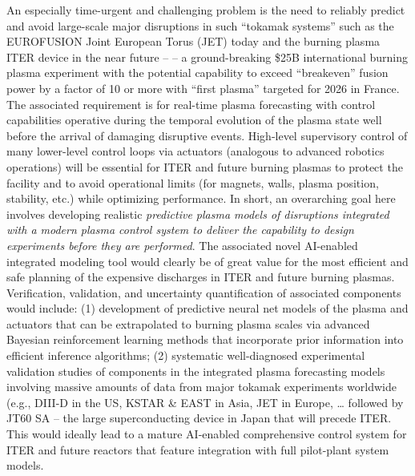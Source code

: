 An especially time-urgent and challenging problem is the need to reliably predict and avoid large-scale major disruptions in such “tokamak systems” such as the EUROFUSION Joint European Torus (JET) today and the burning plasma ITER device in the near future -- -- a ground-breaking \$25B international burning plasma experiment with the potential capability to exceed “breakeven” fusion power by a factor of 10 or more with “first plasma” targeted for 2026 in France.  The associated requirement is for real-time plasma forecasting with control capabilities operative during the temporal evolution of the plasma state well before the arrival of damaging disruptive events.  High-level supervisory control of many lower-level control loops via actuators (analogous to advanced robotics operations) will be essential for ITER and future burning plasmas to protect the facility and to avoid operational limits (for magnets, walls, plasma position, stability, etc.) while optimizing performance.   In short, an overarching goal here involves developing realistic \textit{predictive plasma models of disruptions integrated with a modern plasma control system to deliver the capability to design experiments before they are performed}. The associated novel AI-enabled integrated modeling tool would clearly be of great value for the most efficient and safe planning of the expensive discharges in ITER and future burning plasmas. Verification, validation, and uncertainty quantification of associated components would include: (1) development of predictive neural net models of the plasma and actuators that can be extrapolated to burning plasma scales via advanced Bayesian reinforcement learning methods that incorporate prior information into efficient inference algorithms; (2) systematic well-diagnosed experimental validation studies of components in the integrated plasma forecasting models involving massive amounts of data from major tokamak experiments worldwide (e.g., DIII-D in the US, KSTAR \& EAST in Asia, JET in Europe, … followed by JT60 SA – the large superconducting device in Japan that will precede ITER.  This would ideally lead to a mature AI-enabled comprehensive control system for ITER and future reactors that feature integration with full pilot-plant system models. 
